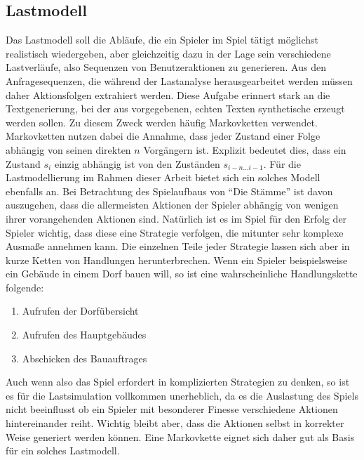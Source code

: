 \documentclass[10pt]{scrartcl}
\begin{document}
  \subsection{Lastmodell}
  Das Lastmodell soll die Abläufe, die ein Spieler im Spiel tätigt möglichst realistisch wiedergeben, aber gleichzeitig dazu in der Lage sein verschiedene Lastverläufe, also Sequenzen von Benutzeraktionen zu generieren. Aus den Anfragesequenzen, die während der Lastanalyse herausgearbeitet werden müssen daher Aktionsfolgen extrahiert werden. Diese Aufgabe erinnert stark an die Textgenerierung, bei der aus vorgegebenen, echten Texten synthetische erzeugt werden sollen. Zu diesem Zweck werden häufig Markovketten verwendet.
  Markovketten nutzen dabei die Annahme, dass jeder Zustand einer Folge abhängig von seinen direkten $n$ Vorgängern ist. Explizit bedeutet dies, dass ein Zustand   $s_i$ einzig abhängig ist von den Zuständen $s_{i-n...i-1}$. Für die Lastmodellierung im Rahmen dieser Arbeit bietet sich ein solches Modell ebenfalls an. Bei Betrachtung des Spielaufbaus von ``Die Stämme'' ist davon auszugehen, dass die allermeisten Aktionen der Spieler abhängig von wenigen ihrer vorangehenden Aktionen sind. Natürlich ist es im Spiel für den Erfolg der Spieler wichtig, dass diese eine Strategie verfolgen, die mitunter sehr komplexe Ausmaße annehmen kann. Die einzelnen Teile jeder Strategie lassen sich aber in kurze Ketten von Handlungen herunterbrechen. Wenn ein Spieler beispielsweise ein Gebäude in einem Dorf bauen will, so ist eine wahrscheinliche Handlungskette folgende:
  
  \begin{enumerate}
    \item Aufrufen der Dorfübersicht
    \item Aufrufen des Hauptgebäudes
    \item Abschicken des Bauauftrages
  \end{enumerate}
  
  Auch wenn also das Spiel erfordert in komplizierten Strategien zu denken, so ist es für die Lastsimulation vollkommen unerheblich, da es die Auslastung des Spiels nicht beeinflusst ob ein Spieler mit besonderer Finesse verschiedene Aktionen hintereinander reiht. Wichtig bleibt aber, dass die Aktionen selbst in korrekter Weise generiert werden können. 
  Eine Markovkette eignet sich daher gut als Basis für ein solches Lastmodell. 
  
\end{document}
